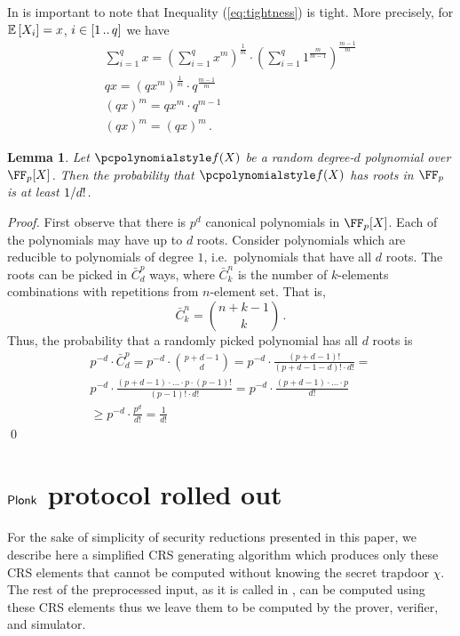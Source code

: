 \let\accentvec\vec \documentclass[runningheads,10pt]{llncs}
\newtheorem{lemma}[theorem]{Lemma}
\begin{document}
\begin{remark}
	In is important to note that Inequality (\ref{eq:tightness}) is tight. More precisely, for $\mathbb{E}\left[X_i\right] = x$, $i \in [1 \, .. \, q]$ we have
	\begin{gather*}
		\sum_{i = 1}^q x = \left(\sum_{i = 1}^{q} x^m\right)^\frac{1}{m} \cdot \left(\sum_{i = 1}^{q} 1^{\frac{m}{m - 1}}\right)^{\frac{m - 1}{m}} \\
		qx = \left(qx^m\right)^\frac{1}{m} \cdot q^{\frac{m - 1}{m}} \\
		(qx)^m = qx^m \cdot q^{m - 1} \\
		(qx)^m = (qx)^m\,.
	\end{gather*}
\end{remark}

	\begin{lemma}
			\label{lem:root_prob}
			Let $\p{f}(X)$ be a random degree-$d$ polynomial over $\FF_p[X]$. Then
			the probability that $\p{f}(X)$ has roots in $\FF_p$ is at least
			$1 / d!$.
	\end{lemma}
	\begin{proof}
			First observe that there is $p^{d}$ canonical polynomials in $\FF_p[X]$.
			Each of the polynomials may have up to $d$ roots. Consider polynomials
			which are reducible to polynomials of degree $1$, i.e.~polynomials that
			have all $d$ roots. The roots can be picked in $\bar{C}^{p}_{d}$
			ways, where $\bar{C}^{n}_{k}$ is the number of
			$k$-elements combinations with 
			repetitions from $n$-element set. That is,
			\[
					\bar{C}^n_k = \binom{n + k - 1}{k}\,.
			\]
			Thus, the probability that a randomly picked polynomial has all $d$
			roots is 
			\begin{multline*}
			p^{-d} \cdot \bar{C}^p_d = p^{-d} \cdot \binom{p + d - 1}{d} =
					 p^{-d} \cdot \frac{(p + d - 1)!}{(p + d - 1 - d)! \cdot d!} = \\
					 p^{-d} \cdot \frac{(p + d - 1) \cdot \ldots \cdot p \cdot (p -
						 1)!}{(p - 1)! \cdot d!} =  p^{-d} \cdot \frac{(p + d - 1)\cdot
							 \ldots \cdot p}{d!} \\
					 \geq  p^{-d} \cdot {\frac{p^d}{d!}} = \frac{1}{d!}
			\end{multline*}
			\qed
	\end{proof}


\section{$\textnormal{\textsf{Plonk}}$ protocol rolled out}
\label{sec:plonk_explained}
For the sake of simplicity of security reductions presented in this paper, we
describe here a simplified CRS generating algorithm which produces only
these CRS elements that cannot be computed without knowing the secret trapdoor
$\chi$. The rest of the preprocessed input, as it is called in
\cite{EPRINT:GabWilCio}, can be computed using these CRS elements thus we leave
them to be computed by the prover, verifier, and simulator. 
\end{document}
